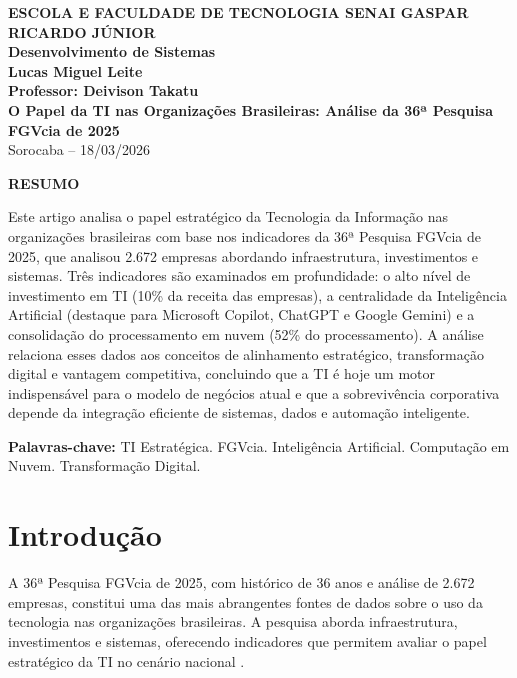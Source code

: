 \documentclass[12pt,a4paper,oneside]{article}
\begin{document}
\begin{center}
  \textbf{\large ESCOLA E FACULDADE DE TECNOLOGIA SENAI GASPAR RICARDO JÚNIOR}\\
  \textbf{Desenvolvimento de Sistemas}\\[1cm]
  \textbf{\Large Lucas Miguel Leite}\\[0.5cm]
  \textbf{Professor: Deivison Takatu}\\[2cm]
  \textbf{\LARGE\textbf{O Papel da TI nas Organizações Brasileiras: Análise da 36ª Pesquisa FGVcia de 2025}}\\[1cm]
  Sorocaba -- 18/03/2026
\end{center}

\vspace{1cm}

\begin{center}
  \textbf{RESUMO}
\end{center}

Este artigo analisa o papel estratégico da Tecnologia da Informação nas organizações brasileiras com base nos indicadores da 36ª Pesquisa FGVcia de 2025, que analisou 2.672 empresas abordando infraestrutura, investimentos e sistemas. Três indicadores são examinados em profundidade: o alto nível de investimento em TI (10\% da receita das empresas), a centralidade da Inteligência Artificial (destaque para Microsoft Copilot, ChatGPT e Google Gemini) e a consolidação do processamento em nuvem (52\% do processamento). A análise relaciona esses dados aos conceitos de alinhamento estratégico, transformação digital e vantagem competitiva, concluindo que a TI é hoje um motor indispensável para o modelo de negócios atual e que a sobrevivência corporativa depende da integração eficiente de sistemas, dados e automação inteligente.

\vspace{0.5cm}
\textbf{Palavras-chave:} TI Estratégica. FGVcia. Inteligência Artificial. Computação em Nuvem. Transformação Digital.

\newpage

\section{Introdução}

A 36ª Pesquisa FGVcia de 2025, com histórico de 36 anos e análise de 2.672 empresas, constitui uma das mais abrangentes fontes de dados sobre o uso da tecnologia nas organizações brasileiras. A pesquisa aborda infraestrutura, investimentos e sistemas, oferecendo indicadores que permitem avaliar o papel estratégico da TI no cenário nacional \cite{fgvcia2025}.
\end{document}

